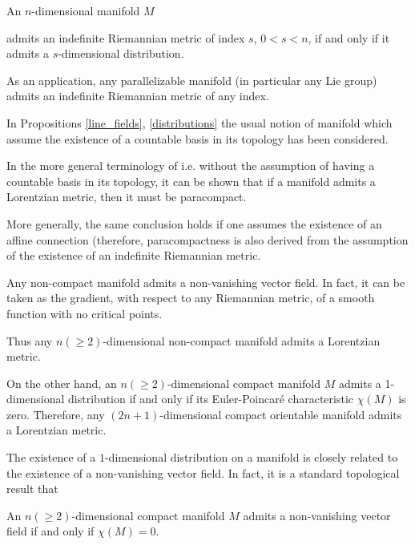 \begin{pro}\label{distributions}  An $n$-dimensional manifold $M$

admits an indefinite Riemannian metric of index $s$, $0<s<n$, if and only if it admits a $s$-dimensional distribution.

\end{pro}


As an application, any parallelizable manifold (in particular any Lie group) admits an indefinite Riemannian metric of any index.


\begin{rem}{\rm In Propositions \ref{line_fields}, \ref{distributions} the usual notion of manifold which assume the existence of a countable basis in its topology has been considered.

In the more general terminology of \cite{kobnom63} i.e. without the assumption of having a countable basis in its topology, it can be shown \cite{marathe72} that if a manifold admits a Lorentzian metric, then it must be paracompact.

More generally, the same conclusion holds \cite[Cor. 25]{spivak79} if one assumes the existence of an affine connection (therefore, paracompactness is also derived from the assumption of the existence of an indefinite Riemannian metric.}

\end{rem}


Any non-compact manifold admits a non-vanishing vector field. In fact, it can be taken as the gradient, with respect to any Riemannian metric, of a smooth function with no critical points.

Thus any $n(\geq 2)$-dimensional non-compact manifold admits a Lorentzian metric.

On the other hand, an $n(\geq 2)$-dimensional compact manifold $M$ admits a 1-dimensional distribution if and only if its Euler-Poincar\'{e} characteristic $\chi (M)$ is zero. Therefore, any $(2n+1)$-dimensional compact orientable manifold admits a Lorentzian metric.


\vspace{2mm}


The existence of a $1$-dimensional distribution on a manifold is closely related to the existence of a non-vanishing vector field. In fact, it is a standard topological result that

\begin{pro}

An $n(\geq 2)$-dimensional compact manifold $M$ admits a non-vanishing vector field if and only if $\chi(M)=0$.

\end{pro}


